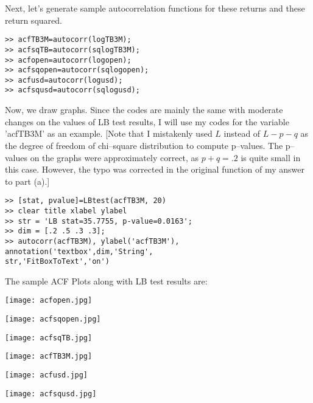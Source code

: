 \documentclass[11pt]{article}
\begin{document}
Next, let's generate sample autocorrelation functions for these returns and these return squared.

\begin{lstlisting}
>> acfTB3M=autocorr(logTB3M);
>> acfsqTB=autocorr(sqlogTB3M);
>> acfopen=autocorr(logopen);
>> acfsqopen=autocorr(sqlogopen);
>> acfusd=autocorr(logusd);
>> acfsqusd=autocorr(sqlogusd);
\end{lstlisting}

Now, we draw graphs. Since the codes are mainly the same with moderate changes on the values of LB test results, I will use my codes for the variable 'acfTB3M' as an example. 
[Note that I mistakenly used $L$ instead of $L-p-q$ as the degree of freedom of chi--square distribution to compute p--values. The p--values on the graphs were approximately correct, as $p+q=.2$ is quite small in this case. However, the typo was corrected in the original function of my answer to part (a).]
\begin{lstlisting}
>> [stat, pvalue]=LBtest(acfTB3M, 20)
>> clear title xlabel ylabel
>> str = 'LB stat=35.7755, p-value=0.0163';
>> dim = [.2 .5 .3 .3];
>> autocorr(acfTB3M), ylabel('acfTB3M'), annotation('textbox',dim,'String',
str,'FitBoxToText','on')
\end{lstlisting}

The sample ACF Plots along with LB test results are:

\texttt{[image: acfopen.jpg]}

\texttt{[image: acfsqopen.jpg]}

\texttt{[image: acfsqTB.jpg]}

\texttt{[image: acfTB3M.jpg]}

\texttt{[image: acfusd.jpg]}

\texttt{[image: acfsqusd.jpg]}
\end{document}
